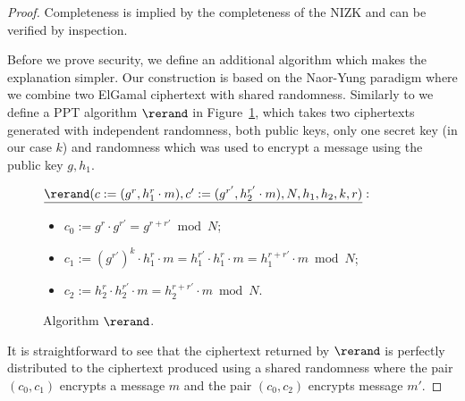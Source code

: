 \begin{proof}
Completeness is implied by the completeness of the NIZK and can be verified by inspection. 

Before we prove security, we define an additional algorithm which makes the explanation simpler. Our construction is based on the Naor-Yung paradigm where we combine two ElGamal ciphertext with shared randomness. 
Similarly to \cite{SCN:BiaMasVen16} we define a PPT algorithm $\rerand$ in Figure~\ref{fig:rerand}, which takes two ciphertexts generated with independent randomness, both public keys, only one secret key (in our case $k$) and randomness which was used to encrypt a message using the public key $g, h_1$. 

\begin{figure}[tb]
\centering
\begin{minipage}{0.75\textwidth}
$\underline{\rerand(c:= (g^{r}, h_1^{r}\cdot m), c':= (g^{r'}, h_2^{r'}\cdot m), N, h_1, h_2, k, r)}:$
\vspace{-2mm}
\begin{itemize}
\item $c_0:= g^{r}\cdot{g^{r'}} = g^{r+r'} \bmod N$;
\item $c_1:= (g^{r'})^k \cdot h_1^{r}\cdot m  =  h_1^{r'}\cdot h_1^{r}\cdot m = h_1^{r+r'}\cdot m \bmod N$;
\item $c_2:=h_2^{r} \cdot h_2^{r'}\cdot m = h_2^{r+r'}\cdot m \bmod N$.
\end{itemize}
\end{minipage}
\caption{\label{fig:rerand}Algorithm $\rerand$.}
\end{figure}




It is straightforward to see that the ciphertext returned by $\rerand$ is perfectly distributed to the ciphertext produced using a shared randomness where the pair $(c_0, c_1)$ encrypts a message $m$ and the pair $(c_0, c_2)$ encrypts message $m'$.


\end{proof}
